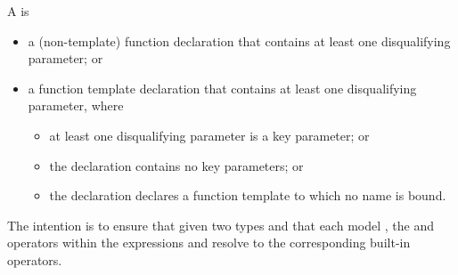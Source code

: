 \pnum
A  is
\begin{itemize}
\item a (non-template) function declaration that contains at least one disqualifying parameter; or
\item a function template declaration that contains at least one disqualifying parameter, where
\begin{itemize}
\item at least one disqualifying parameter is a key parameter; or
\item the declaration contains no key parameters; or
\item the declaration declares a function template to which no name is bound.
\end{itemize}
\end{itemize}

\pnum
\begin{note}
The intention is to ensure that given two types  and  that each model , the \tcode{\&\&} and \tcode{||} operators within the expressions  and  resolve to the corresponding built-in operators.
\end{note}
